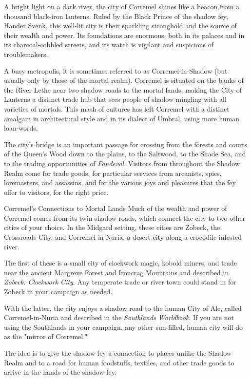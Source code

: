\documentclass[10pt,a4paper,twoside,bg=print,twocolumn,openany,nodeprecatedcode]{dndbook}
\begin{document}
A bright light on a dark river, the city of Corremel shines like a beacon from a thousand black-iron lanterns. Ruled by the Black Prince of the shadow fey, Hander Svenk, this well-lit city is their sparkling stronghold and the source of their wealth and power. Its foundations are enormous, both in its palaces and in its charcoal-cobbled streets, and its watch is vigilant and suspicious of troublemakers.

A busy metropolis, it is sometimes referred to as Corremel-in-Shadow (but usually only by those of the mortal realm). Corremel is situated on the banks of the River Lethe near two shadow roads to the mortal lands, making the City of Lanterns a distinct trade hub that sees people of shadow mingling with all varieties of mortals. This mash of cultures has left Corremel with a distinct amalgam in architectural style and in its dialect of Umbral, using more human loan-words.

The city's bridge is an important passage for crossing from the forests and courts of the Queen's Wood down to the plains, to the Saltwood, to the Shade Sea, and to the trading opportunities of \textit{Fandeval}. Visitors from throughout the Shadow Realm come for trade goods, for particular services from arcanists, spies, loremasters, and assassins, and for the various joys and pleasures that the fey offer to visitors, for the right price.

\begin{DndSidebar}[float=!b]{Corremel's Connections to Mortal Lands}
Much of the wealth and power of Corremel comes from its twin shadow roads, which connect the city to two other cities of your choice. In the Midgard setting, these cities are Zobeck, the Crossroads City, and Corremel-in-Nuria, a desert city along a crocodile-infested river.



The first of these is a small city of clockwork magic, kobold miners, and trade near the ancient Margreve Forest and Ironcrag Mountains and described in \textit{Zobeck: Clockwork City}. Any temperate trade or river town could stand in for Zobeck in your campaign as needed.



With the latter, the city enjoys a shadow road to the human City of Ale, called Corremel-in-Nuria and described in the \textit{Southlands Worldbook}. If you are not using the Southlands in your campaign, any other sun-filled, human city will do as the "mirror of Corremel."



The idea is to give the shadow fey a connection to places unlike the Shadow Realm and to a road for human foodstuffs, textiles, and other trade goods to arrive in the hands of the shadow fey.



\end{DndSidebar}
\end{document}
